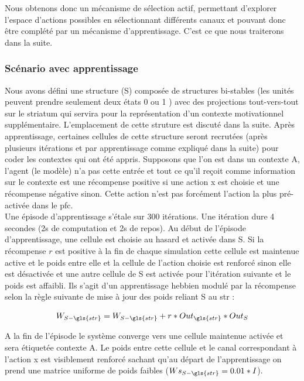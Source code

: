 Nous obtenons donc un mécanisme de sélection actif, permettant d'explorer l'espace d'actions possibles en sélectionnant différents canaux et pouvant donc être complété par un mécanisme d'apprentissage. C'est ce que nous traiterons dans la suite.

\subsubsection{Scénario avec apprentissage}

Nous avons défini une structure (S) composée de structures bi-stables (les unités peuvent prendre seulement deux états 0 ou 1 ) avec des projections tout-vers-tout sur le striatum qui servira pour la représentation d'un contexte motivationnel supplémentaire. L'emplacement de cette struture est discuté dans la suite. Après apprentissage, certaines cellules de cette structure seront recrutées (après plusieurs itérations et par apprentissage comme expliqué dans la suite) pour coder les contextes qui ont été appris. Supposons que l'on est dans un contexte A, l'agent (le modèle) n'a pas cette entrée et tout ce qu'il reçoit comme information sur le contexte est une récompense positive si une action x est choisie et une récompense négative sinon. Cette action n'est pas forcément l'action la plus pré-activée dans le \gls{pfc}.\\

Une épisode d'apprentissage s'étale sur 300 itérations. Une itération dure 4 secondes (2s de computation et 2s de repos). Au début de l'épisode d'apprentissage, une cellule est choisie au hasard et activée dans S. Si la récompense $r$ est positive à la fin de chaque simulation cette cellule est maintenue active et le poids entre elle et la cellule de l'action choisie est renforcé sinon elle est désactivée et une autre cellule de S est activée pour l'itération suivante et le poids est affaibli. Ils s'agit d'un apprentissage hebbien modulé par la récompense selon la règle suivante de mise à jour des poids reliant S au \gls{str} :
 
\begin{center}
\begin{equation} 
W_{S-\gls{str}}= W_{S-\gls{str}}+r*Out_{\gls{str}}*Out_{S}
 \end{equation}
\end{center}

A la fin de l'épisode le système converge vers une cellule maintenue activée et sera étiquetée contexte A. Le poids entre cette cellule et le canal correspondant à l'action x est visiblement renforcé sachant qu'au départ de l'apprentissage on prend une matrice uniforme de poids faibles ($Ws_{S-\gls{str}}=0.01*I$).\\

